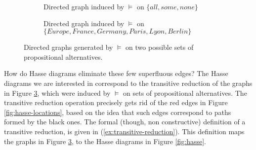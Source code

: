 \begin{figure}[H]
	\centering
	\begin{subfigure}[t]{.45\linewidth}
		\centering
		\caption{Directed graph induced by $\vDash$ on $\lbrace \textit{all}, \textit{some}, \textit{none} \rbrace$}\label{fig:entailment-graph-scalar}
	\end{subfigure}	
	\hfill
	\begin{subfigure}[t]{.45\linewidth}
		\centering
		\caption{Directed graph induced by $\vDash$ on $\lbrace \textit{Europe}, \textit{France}, \textit{Germany}, \textit{Paris}, \textit{Lyon}, \textit{Berlin} \rbrace$}\label{fig:entailment-graph-locations}
	\end{subfigure}
	\caption{Directed graphs generated by $\vDash$ on two possible sets of propositional alternatives.}\label{ex:graph-entailment}
\end{figure}

How do Hasse diagrams eliminate these few superfluous edges? The Hasse diagrams we are interested in correspond to the transitive reduction of the graphs in Figure \ref{ex:graph-entailment}, which were induced by $\vDash$ on sets of propositional alternatives. The transitive reduction operation precisely gets rid of the red edges in Figure \ref{fig:hasse-locations}, based on the idea that such edges correspond to paths formed by the black ones. The formal (though, non constructive) definition of a transitive reduction, is given in (\ref{ex:transitive-reduction}). This definition maps the graphs in Figure \ref{ex:graph-entailment}, to the Hasse diagrams in Figure \ref{fig:hasse}.

\begin{exe}
	\label{ex:transitive-reduction}
\end{exe}

